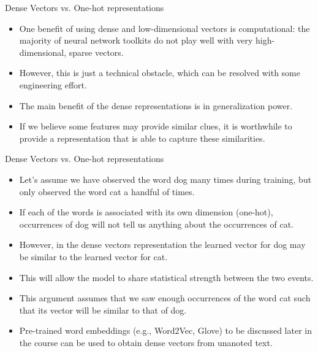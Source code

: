 \documentclass[handout]{beamer}
\begin{document}
\begin{frame}{Dense Vectors vs. One-hot representations}
\begin{scriptsize}


\begin{itemize}

\item One benefit of using dense and low-dimensional vectors is computational: the majority of neural network toolkits do not play well with very high-dimensional, sparse vectors.
\item However, this is just a technical obstacle, which can be resolved with some engineering effort.

\item The main benefit of the dense representations is in generalization power.

\item If we believe some features may provide similar clues, it is worthwhile to provide a representation that is able to capture these similarities. 

\end{itemize}

\end{scriptsize}
\end{frame}



\begin{frame}{Dense Vectors vs. One-hot representations}
\begin{scriptsize}


\begin{itemize}

\item Let's assume we have observed the word dog many times during
training, but only observed the word cat a handful of times. 

\item If each of the words is associated with its own dimension (one-hot), occurrences of dog will not tell us anything about the occurrences of cat. 

\item However, in the dense vectors representation the learned vector for dog may be similar to the learned vector for cat.

\item This will allow the model to share statistical strength between the two events. 

\item This argument assumes that we saw enough occurrences of the word cat such that its vector will be similar to that of dog.

\item Pre-trained word embeddings (e.g., Word2Vec, Glove) to be discussed later in the course can be used to obtain dense vectors from unanoted text.


\end{itemize}

\end{scriptsize}
\end{frame}
\end{document}
